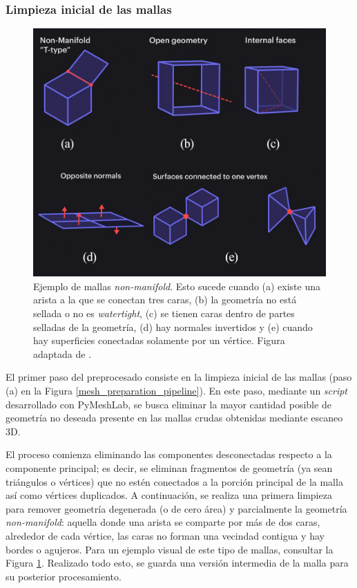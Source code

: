 \subsubsection{Limpieza inicial de las mallas}
\begin{figure}[h]
    \centering
    \includegraphics[width=0.8\linewidth]{figures/4_materials-methods/nonmanifold_examples.png}
    \caption[Ejemplo de mallas \textit{non-manifold}]{Ejemplo de mallas \textit{non-manifold}. Esto sucede cuando (a) existe una arista a la que se conectan tres caras, (b) la geometría no está sellada o no es \textit{watertight}, (c) se tienen caras dentro de partes selladas de la geometría, (d) hay normales invertidos y (e) cuando hay superficies conectadas solamente por un vértice. Figura adaptada de \cite{manifold_types_2021}.}
    \label{non_manifold_types}
\end{figure}

El primer paso del preprocesado consiste en la limpieza inicial de las mallas (paso (a) en la Figura \ref{mesh_preparation_pipeline}). En este paso, mediante un \textit{script} desarrollado con PyMeshLab, se busca eliminar la mayor cantidad posible de geometría no deseada presente en las mallas crudas obtenidas mediante escaneo 3D.

El proceso comienza eliminando las componentes desconectadas respecto a la componente principal; es decir, se eliminan fragmentos de geometría (ya sean triángulos o vértices) que no estén conectados a la porción principal de la malla así como vértices duplicados. A continuación, se realiza una primera limpieza para remover geometría degenerada (o de cero área) y parcialmente la geometría \textit{non-manifold}: aquella donde una arista se comparte por más de dos caras, alrededor de cada vértice, las caras no forman una vecindad contigua y hay bordes o agujeros. Para un ejemplo visual de este tipo de mallas, consultar la Figura \ref{non_manifold_types}. Realizado todo esto, se guarda una versión intermedia de la malla para su posterior procesamiento.

